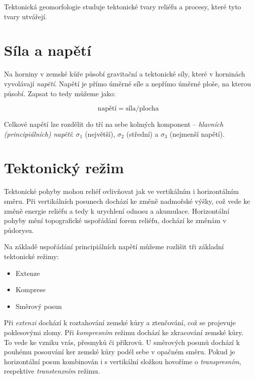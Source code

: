 Tektonická geomorfologie studuje tektonické tvary reliéfu a procesy, které tyto tvary utvářejí.

\section{Síla a napětí}
Na horniny v zemské kůře působí gravitační a tektonické síly, které v horninách vyvolávají \emph{napětí}. Napětí je přímo úměrné síle a nepřímo úměrné ploše, na kterou působí. Zapsat to tedy můžeme jako: 

\begin{equation}\label{eq:napeti}
	\text{napětí} = \text{síla}/\text{plocha}
\end{equation}

Celkové napětí lze rozdělit do tří na sebe kolmých komponent -- \emph{hlavních (principiálních) napětí}: $\sigma_{1}$ (největší), $\sigma_{2}$ (střední) a $\sigma_{3}$ (nejmenší napětí).

\section{Tektonický režim}

Tektonické pohyby mohou reliéf ovlivňovat jak ve vertikálním i horizontálním směru. Při vertikálních posunech dochází ke změně nadmořské výšky, což vede ke změně energie reliéfu a tedy k urychlení odnosu a akumulace. Horizontální pohyby mění topografické uspořádání forem reliéfu, dochází ke změnám v půdorysu. 

Na základě uspořádání principiálních napětí můžeme rozlišit tři základní tektonické režimy:
\begin{itemize}
	\item Extenze
	\item Komprese
	\item Směrový posun
\end{itemize}

Při \emph{extenzi} dochází k roztahování zemské kůry a ztenčování, což se projevuje poklesovými zlomy. Při \emph{kompresním} režimu dochází ke zkracování zemské kůry. To vede ke vzniku vrás, přesmyků či příkrovů. U směrových posunů dochází k pouhému posouvání ker zemské kůry podél sebe v opačném směru. Pokud je horizontální posun kombinován i s vertikální složkou hovoříme o \emph{transpresním}, respektive \emph{transtenzním} režimu.


